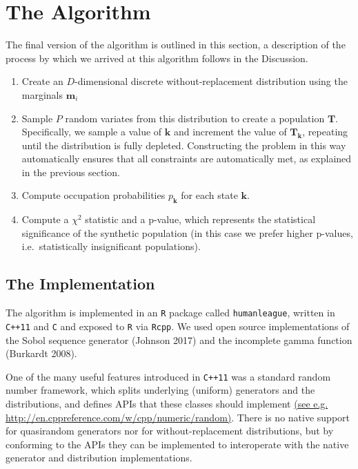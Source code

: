 \documentclass[]{article}
\begin{document}
\section{The Algorithm}\label{the-algorithm}

The final version of the algorithm is outlined in this section, a
description of the process by which we arrived at this algorithm follows
in the Discussion.

\begin{enumerate}
\def\labelenumi{\arabic{enumi}.}
\item
  Create an \(D\)-dimensional discrete without-replacement distribution
  using the marginals \(\mathbf{m}_i\)
\item
  Sample \(P\) random variates from this distribution to create a
  population \(\mathbf{T}\). Specifically, we sample a value of
  \(\mathbf{k}\) and increment the value of \(\mathbf{T}_\mathbf{k}\),
  repeating until the distribution is fully depleted. Constructing the
  problem in this way automatically ensures that all constraints are
  automatically met, as explained in the previous section.
\item
  Compute occupation probabilities \(p_\mathbf{k}\) for each state
  \(\mathbf{k}\).
\item
  Compute a \(\chi^2\) statistic and a p-value, which represents the
  statistical significance of the synthetic population (in this case we
  prefer higher p-values, i.e.~statistically insignificant populations).
\end{enumerate}

\subsection{The Implementation}\label{the-implementation}

The algorithm is implemented in an \texttt{R} package called
\texttt{humanleague}, written in \texttt{C++11} and \texttt{C} and
exposed to \texttt{R} via \texttt{Rcpp}. We used open source
implementations of the Sobol sequence generator (Johnson 2017) and the
incomplete gamma function (Burkardt 2008).

One of the many useful features introduced in \texttt{C++11} was a
standard random number framework, which splits underlying (uniform) generators
and the distributions, and defines APIs that these classes should
implement \href{http://en.cppreference.com/w/cpp/numeric/random}{(see
e.g. http://en.cppreference.com/w/cpp/numeric/random)}. There is no
native support for quasirandom generators nor for without-replacement
distributions, but by conforming to the APIs they can be implemented to
interoperate with the native generator and distribution implementations.
\end{document}
